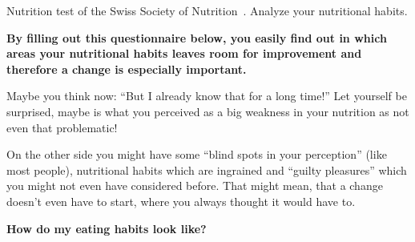 \documentclass[../main.tex]{subfiles}
\begin{document}
Nutrition test of the Swiss Society of Nutrition~\cite{SGE}. Analyze your nutritional habits.

\vspace{5mm}

\textbf{By filling out this questionnaire below, you easily find out in which areas your nutritional habits leaves room for improvement
  and therefore a change is especially important.}

\vspace{5mm}

Maybe you think now: ``But I already know that for a long time!''
Let yourself be surprised, maybe is what you perceived as a big weakness in your nutrition as not even that problematic!

On the other side you might have some ``blind spots in your perception'' (like most people),
nutritional habits which are ingrained and ``guilty pleasures'' which you might not even have considered before.
That might mean, that a change doesn't even have to start, where you always thought it would have to.

\vspace{5mm}

\textbf{How do my eating habits look like?}

\vspace{5mm}
\end{document}
